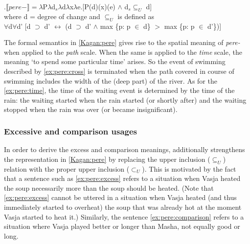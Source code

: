 \ex.\label{Kagan:pere}$\llbracket pere- \rrbracket = \lambda$P$\lambda$d$_s\lambda$d$\lambda$x$\lambda$e.[P(d)(x)(e) $\wedge$ d$_s \subseteq _U$ d]\\
where d = degree of change \citep{KennedyLevin:02} and $\subseteq _U$ is defined as\\
$\forall$d$\forall$d' [d $\supset$ d' $\leftrightarrow$ (d $\supset$ d' $\wedge$ max \{p: p $\in$ d\} $>$ max \{p: p $\in$ d'\})]
\begin{flushright}
\vspace{-0.5em}
\citep[from][123]{Kagan:book}
\end{flushright}

The formal semantics in \ref{Kagan:pere} gives rise to the spatial meaning of \textit{pere-} when applied to the \textit{path} scale. When the same is applied to the \textit{time} scale, the meaning `to spend some particular time' arises. So the event of swimming described by \ref{ex:pere:cross} is terminated when the path covered in course of swimming includes the width of the (deep part) of the river. As for the \ref{ex:pere:time}, the time of the waiting event is determined by the time of the rain: the waiting started when the rain started (or shortly after) and the waiting stopped when the rain was over (or became insignificant).

\subsubsection{Excessive and comparison usages}
In order to derive the excess and comparison meanings, \citet[133]{Kagan:book} additionally strengthens the representation in \ref{Kagan:pere} by replacing the upper inclusion ($\subseteq _U$) relation with the proper upper inclusion ($\subset _U$). This is motivated by the fact that a sentence such as \ref{ex:pere:excess} refers to a situation when Vasja heated the soup necessarily more than the soup should be heated. (Note that \ref{ex:pere:excess} cannot be uttered in a situation when Vasja heated (and thus immediately started to overheat) the soup that was already hot at the moment Vasja started to heat it.) Similarly, the sentence \ref{ex:pere:comparison} refers to a situation where Vasja played better or longer than Masha, not equally good or long.

